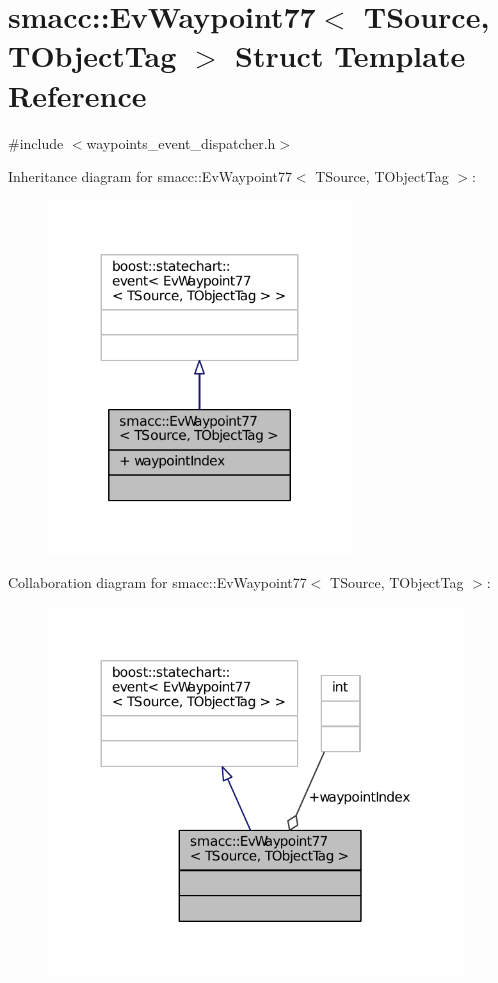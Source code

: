 \hypertarget{structsmacc_1_1EvWaypoint77}{}\section{smacc\+:\+:Ev\+Waypoint77$<$ T\+Source, T\+Object\+Tag $>$ Struct Template Reference}
\label{structsmacc_1_1EvWaypoint77}


{\ttfamily \#include $<$waypoints\+\_\+event\+\_\+dispatcher.\+h$>$}



Inheritance diagram for smacc\+:\+:Ev\+Waypoint77$<$ T\+Source, T\+Object\+Tag $>$\+:
\nopagebreak
\begin{figure}[H]
\begin{center}
\leavevmode
\includegraphics[width=227pt]{structsmacc_1_1EvWaypoint77__inherit__graph}
\end{center}
\end{figure}


Collaboration diagram for smacc\+:\+:Ev\+Waypoint77$<$ T\+Source, T\+Object\+Tag $>$\+:
\nopagebreak
\begin{figure}[H]
\begin{center}
\leavevmode
\includegraphics[width=312pt]{structsmacc_1_1EvWaypoint77__coll__graph}
\end{center}
\end{figure}
